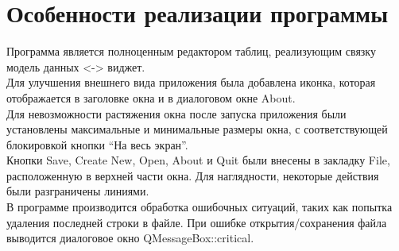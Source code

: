 \documentclass[a4paper]{article}
\begin{document}
    {\section{Особенности реализации программы}
    Программа является полноценным редактором таблиц, реализующим связку модель данных <-> виджет.\\
    
    Для улучшения внешнего вида приложения была добавлена иконка, которая отображается в заголовке окна и в диалоговом окне About.\\
    
    Для невозможности растяжения окна после запуска приложения были установлены максимальные и минимальные размеры окна, с соответствующей блокировкой кнопки “На весь экран”.\\
    
    Кнопки Save, Create New, Open, About и Quit были внесены в закладку File, расположенную в верхней части окна. Для наглядности, некоторые действия были разграничены линиями.\\
    
    В программе производится обработка ошибочных ситуаций, таких как попытка удаления последней строки в файле. При ошибке открытия/сохранения файла выводится диалоговое окно QMessageBox::critical.\\      
    }   	            
\end{document}
